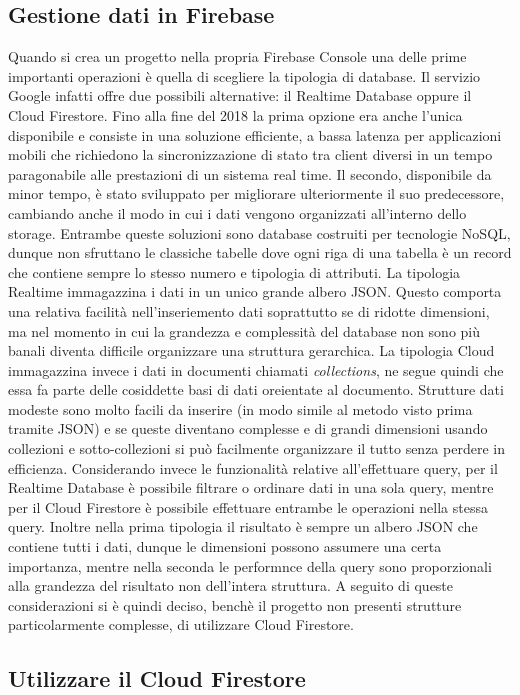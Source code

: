 \subsection{Gestione dati in Firebase}
Quando si crea un progetto nella propria Firebase Console una delle prime
importanti operazioni è quella di scegliere la tipologia di database. Il
servizio Google infatti offre due possibili alternative: il Realtime Database
oppure il Cloud Firestore. Fino alla fine del 2018 la prima opzione era anche
l'unica disponibile e consiste in una soluzione efficiente, a bassa latenza per
applicazioni mobili che richiedono la sincronizzazione di stato tra client
diversi in un tempo paragonabile alle prestazioni di un sistema real time. Il
secondo, disponibile da minor tempo, è stato sviluppato per migliorare
ulteriormente il suo predecessore, cambiando anche il modo in cui i dati vengono
organizzati all'interno dello storage. Entrambe queste soluzioni sono database
costruiti per tecnologie NoSQL, dunque non sfruttano le classiche tabelle dove
ogni riga di una tabella è un record che contiene sempre lo stesso numero e
tipologia di attributi. La tipologia Realtime immagazzina i dati in un unico
grande albero JSON. Questo comporta una relativa facilità nell'inseriemento dati
soprattutto se di ridotte dimensioni, ma nel momento in cui la grandezza e
complessità del database non sono più banali diventa difficile organizzare una
struttura gerarchica. La tipologia Cloud immagazzina invece i dati in documenti
chiamati \textit{collections}, ne segue quindi che essa fa parte delle cosiddette
basi di dati oreientate al documento. Strutture dati modeste sono molto facili
da inserire (in modo simile al metodo visto prima tramite JSON) e se queste
diventano complesse e di grandi dimensioni usando collezioni e sotto-collezioni si
può facilmente organizzare il tutto senza perdere in efficienza. Considerando
invece le funzionalità relative all'effettuare query, per il Realtime Database è
possibile filtrare o ordinare dati in una sola query, mentre per il Cloud
Firestore è possibile effettuare entrambe le operazioni nella stessa query.
Inoltre nella prima tipologia il risultato è sempre un albero JSON che contiene
tutti i dati, dunque le dimensioni possono assumere una certa importanza, mentre
nella seconda le performnce della query sono proporzionali alla grandezza del
risultato non dell'intera struttura. A seguito di queste considerazioni si è
quindi deciso, benchè il progetto non presenti strutture particolarmente
complesse, di utilizzare Cloud Firestore. 

\subsection{Utilizzare il Cloud Firestore}
